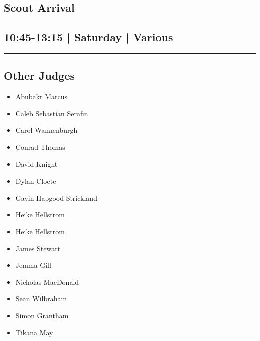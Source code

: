 \documentclass[10pt, A5]{article}
\begin{document}
        \begin{framed}
        \begin{minipage}{\textwidth}

        \setcounter{section}{4}
        \section{Scout Arrival}
        \subsection*{10:45-13:15 | Saturday | Various}

        \vspace{0.25cm}
        \hrule
        \vspace{0.25cm}


        \subsection*{Other Judges}
                    

        	\begin{multicols}{2}

		\begin{itemize}
									\item Abubakr Marcus
									\item Caleb Sebastian Serafin
									\item Carol Wannenburgh
									\item Conrad Thomas
									\item David Knight
									\item Dylan Cloete
									\item Gavin Hapgood-Strickland
									\item Heike Hellstrom
						\end{itemize}

		\vfill\null
		\columnbreak

		\begin{itemize}
									\item Heike Hellstrom
									\item James Stewart
									\item Jemma Gill
									\item Nicholas MacDonald
									\item Sean Wilbraham
									\item Simon Grantham
									\item Tikana May
						\end{itemize}


\end{multicols}
\end{minipage}
\end{framed}
\end{document}
